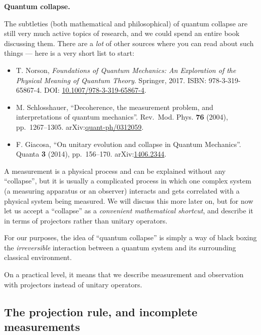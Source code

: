 \documentclass[fleqn,a4paper]{article}
\providecommand{\tightlist}{\setlength{\itemsep}{0pt}\setlength{\parskip}{0pt}}
\newenvironment{idea}{\everypar{\setlength{\parindent}{1.5em}}}{}
\newenvironment{technical}[1]{\textbf{#1.}\par\vspace{.5\baselineskip}\everypar{\setlength{\parindent}{1.5em}}}{}
\theoremstyle{definition}
\theoremstyle{definition}
\theoremstyle{definition}
\theoremstyle{definition}
\theoremstyle{remark}
\begin{document}
\begin{technical}{Quantum collapse}

The subtleties (both mathematical and philosophical) of quantum collapse are still very much active topics of research, and we could spend an entire book discussing them.
There are a \emph{lot} of other sources where you can read about such things --- here is a very short list to start:

\begin{itemize}
\tightlist
\item
  T. Norson, \emph{Foundations of Quantum Mechanics: An Exploration of the Physical Meaning of Quantum Theory}. Springer, 2017. ISBN: 978-3-319-65867-4. DOI: \href{https://doi.org/10.1007/978-3-319-65867-4}{10.1007/978-3-319-65867-4}.
\item
  M. Schlosshauer, ``Decoherence, the measurement problem, and interpretations of quantum mechanics''. Rev.~Mod. Phys. \textbf{76} (2004), pp.~1267--1305. arXiv:\href{https://arxiv.org/abs/quant-ph/0312059}{quant-ph/0312059}.
\item
  F. Giacosa, ``On unitary evolution and collapse in Quantum Mechanics''. Quanta \textbf{3} (2014), pp.~156--170. arXiv:\href{https://arxiv.org/abs/1406.2344}{1406.2344}.
\end{itemize}

\end{technical}

A measurement is a physical process and can be explained without any ``collapse'', but it is usually a complicated process in which one complex system (a measuring apparatus or an observer) interacts and gets correlated with a physical system being measured.
We will discuss this more later on, but for now let us accept a ``collapse'' as a \emph{convenient mathematical shortcut}, and describe it in terms of projectors rather than unitary operators.

\begin{idea}
For our purposes, the idea of ``quantum collapse'' is simply a way of black boxing the \emph{irreversible} interaction between a quantum system and its surrounding classical environment.

On a practical level, it means that we describe measurement and observation with projectors instead of unitary operators.

\end{idea}

\hypertarget{projection-rule-and-incomplete-measurements}{%
\subsection{The projection rule, and incomplete measurements}\label{projection-rule-and-incomplete-measurements}}
\end{document}
